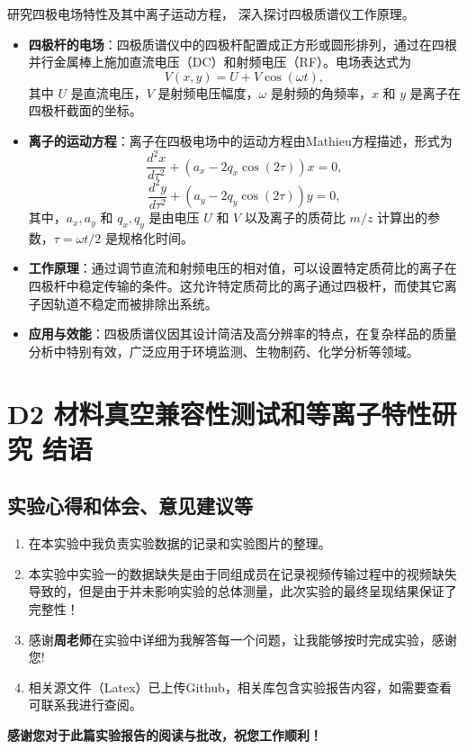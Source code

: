 \documentclass[dvipsnames, svgnames,a4paper,11pt]{article}
\begin{document}
	\begin{question}
		研究四极电场特性及其中离子运动方程， 深入探讨四极质谱仪工作原理。
	\end{question}
	
\begin{itemize}
    \item \textbf{四极杆的电场}：四极质谱仪中的四极杆配置成正方形或圆形排列，通过在四根并行金属棒上施加直流电压（DC）和射频电压（RF）。电场表达式为
    \[
    V(x, y) = U + V \cos(\omega t),
    \]
    其中 \(U\) 是直流电压，\(V\) 是射频电压幅度，\(\omega\) 是射频的角频率，\(x\) 和 \(y\) 是离子在四极杆截面的坐标。

    \item \textbf{离子的运动方程}：离子在四极电场中的运动方程由Mathieu方程描述，形式为
    \[
    \frac{d^2 x}{d \tau^2} + (a_x - 2q_x \cos(2 \tau)) x = 0,
    \]
    \[
    \frac{d^2 y}{d \tau^2} + (a_y - 2q_y \cos(2 \tau)) y = 0,
    \]
    其中，\(a_x, a_y\) 和 \(q_x, q_y\) 是由电压 \(U\) 和 \(V\) 以及离子的质荷比 \(m/z\) 计算出的参数，\(\tau = \omega t / 2\) 是规格化时间。

    \item \textbf{工作原理}：通过调节直流和射频电压的相对值，可以设置特定质荷比的离子在四极杆中稳定传输的条件。这允许特定质荷比的离子通过四极杆，而使其它离子因轨道不稳定而被排除出系统。

    \item \textbf{应用与效能}：四极质谱仪因其设计简洁及高分辨率的特点，在复杂样品的质量分析中特别有效，广泛应用于环境监测、生物制药、化学分析等领域。
\end{itemize}
	
	
	\clearpage
	
	\section{D2 材料真空兼容性测试和等离子特性研究 \quad\heiti 结语}
	
	\subsection{实验心得和体会、意见建议等}
	\begin{enumerate}
		\item 在本实验中我负责实验数据的记录和实验图片的整理。
		\item 本实验中实验一的数据缺失是由于同组成员在记录视频传输过程中的视频缺失导致的，但是由于并未影响实验的总体测量，此次实验的最终呈现结果保证了完整性！
		\item 感谢\textbf{周老师}在实验中详细为我解答每一个问题，让我能够按时完成实验，感谢您!
		\item 相关源文件（Latex）已上传Github，相关库包含实验报告内容，如需要查看可联系我进行查阅。
	\end{enumerate}
	\quad \large \textbf{感谢您对于此篇实验报告的阅读与批改，祝您工作顺利！}
	
\end{document}
